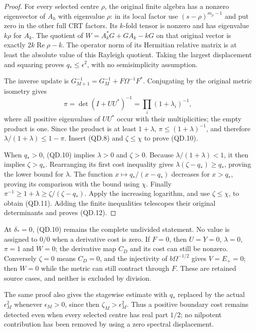 \begin{proof}
For every selected centre \(\rho\), the original finite
algebra has a nonzero eigenvector of \(A_h\) with eigenvalue
\(\rho\): in its local factor use \((s-\rho)^{m_\rho-1}\)
and put zero in the other full CRT factors.  Its \(k\)-fold
tensor is nonzero and has eigenvalue \(k\rho\) for \(A_k\).
The quotient of \(W=A_k^*G+GA_k-kG\) on that original vector
is exactly \(2k\operatorname{Re}\rho-k\).  The operator
norm of its Hermitian relative matrix is at least the absolute
value of this Rayleigh quotient.  Taking the largest displacement
and squaring proves \(q_*\leq\epsilon^2\), with no
semisimplicity assumption.

The inverse update is
\(G_{M+1}^{-1}=G_M^{-1}+F\Omega^{-1}F^*\).  Conjugating
by the original metric isometry gives
\[
 \pi=\det(I+UU^*)^{-1}
       =\prod_i(1+\lambda_i)^{-1},
\]
where all positive eigenvalues of \(UU^*\) occur with their
multiplicities; the empty product is one.  Since the product
is at least \(1+\lambda\),
\(\pi\leq(1+\lambda)^{-1}\), and therefore
\(\lambda/(1+\lambda)\leq1-\pi\).  Insert (QD.8)
and \(\zeta\leq\chi\) to prove (QD.10).

When \(q_*>0\), (QD.10) implies \(\lambda>0\) and
\(\zeta>0\).  Because \(\lambda/(1+\lambda)<1\),
it then implies \(\zeta>q_*\).  Rearranging its first
cost inequality gives
\(\lambda(\zeta-q_*)\geq q_*\), proving the lower
bound for \(\lambda\).  The function \(x\mapsto
q_* /(x-q_*)\) decreases for \(x>q_*\), proving its
comparison with the bound using \(\chi\).
Finally \(\pi^{-1}\geq1+\lambda\geq
\zeta/(\zeta-q_*)\).  Apply the increasing logarithm,
and use \(\zeta\leq\chi\), to obtain (QD.11).
Adding the finite inequalities telescopes their original
determinants and proves (QD.12).
\end{proof}

At \(\delta_*=0\), (QD.10) remains the complete undivided
statement.  No value is assigned to \(0/0\) when a derivative
cost is zero.  If \(F=0\), then \(U=Y=0\),
\(\lambda=0\), \(\pi=1\) and \(W=0\); the derivative
map \(C_D\) and its cost can still be nonzero.  Conversely
\(\zeta=0\) means \(C_D=0\), and the injectivity of
\(b\Omega^{-1/2}\) gives \(V=E_+=0\); then \(W=0\)
while the metric can still contract through \(F\).  These
are retained source cases, and neither is excluded by division.

The same proof also gives the stagewise estimate with \(q_*\)
replaced by the actual \(\epsilon_M^2\) whenever
\(\epsilon_M>0\), since then \(\zeta_M>\epsilon_M^2\).
Thus a positive boundary cost remains detected even when every
selected centre has real part \(1/2\); no nilpotent contribution
has been removed by using a zero spectral displacement.

